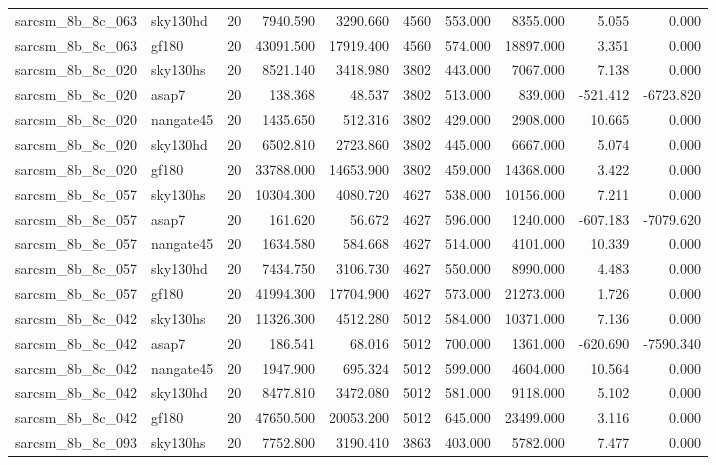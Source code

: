 \documentclass{article}
\begin{document}
\begin{longtable}{llrrrrrrrr}
sarcsm\_8b\_8c\_063 & sky130hd & 20 & 7940.590 & 3290.660 & 4560 & 553.000 & 8355.000 & 5.055 & 0.000 \\
sarcsm\_8b\_8c\_063 & gf180 & 20 & 43091.500 & 17919.400 & 4560 & 574.000 & 18897.000 & 3.351 & 0.000 \\
sarcsm\_8b\_8c\_020 & sky130hs & 20 & 8521.140 & 3418.980 & 3802 & 443.000 & 7067.000 & 7.138 & 0.000 \\
sarcsm\_8b\_8c\_020 & asap7 & 20 & 138.368 & 48.537 & 3802 & 513.000 & 839.000 & -521.412 & -6723.820 \\
sarcsm\_8b\_8c\_020 & nangate45 & 20 & 1435.650 & 512.316 & 3802 & 429.000 & 2908.000 & 10.665 & 0.000 \\
sarcsm\_8b\_8c\_020 & sky130hd & 20 & 6502.810 & 2723.860 & 3802 & 445.000 & 6667.000 & 5.074 & 0.000 \\
sarcsm\_8b\_8c\_020 & gf180 & 20 & 33788.000 & 14653.900 & 3802 & 459.000 & 14368.000 & 3.422 & 0.000 \\
sarcsm\_8b\_8c\_057 & sky130hs & 20 & 10304.300 & 4080.720 & 4627 & 538.000 & 10156.000 & 7.211 & 0.000 \\
sarcsm\_8b\_8c\_057 & asap7 & 20 & 161.620 & 56.672 & 4627 & 596.000 & 1240.000 & -607.183 & -7079.620 \\
sarcsm\_8b\_8c\_057 & nangate45 & 20 & 1634.580 & 584.668 & 4627 & 514.000 & 4101.000 & 10.339 & 0.000 \\
sarcsm\_8b\_8c\_057 & sky130hd & 20 & 7434.750 & 3106.730 & 4627 & 550.000 & 8990.000 & 4.483 & 0.000 \\
sarcsm\_8b\_8c\_057 & gf180 & 20 & 41994.300 & 17704.900 & 4627 & 573.000 & 21273.000 & 1.726 & 0.000 \\
sarcsm\_8b\_8c\_042 & sky130hs & 20 & 11326.300 & 4512.280 & 5012 & 584.000 & 10371.000 & 7.136 & 0.000 \\
sarcsm\_8b\_8c\_042 & asap7 & 20 & 186.541 & 68.016 & 5012 & 700.000 & 1361.000 & -620.690 & -7590.340 \\
sarcsm\_8b\_8c\_042 & nangate45 & 20 & 1947.900 & 695.324 & 5012 & 599.000 & 4604.000 & 10.564 & 0.000 \\
sarcsm\_8b\_8c\_042 & sky130hd & 20 & 8477.810 & 3472.080 & 5012 & 581.000 & 9118.000 & 5.102 & 0.000 \\
sarcsm\_8b\_8c\_042 & gf180 & 20 & 47650.500 & 20053.200 & 5012 & 645.000 & 23499.000 & 3.116 & 0.000 \\
sarcsm\_8b\_8c\_093 & sky130hs & 20 & 7752.800 & 3190.410 & 3863 & 403.000 & 5782.000 & 7.477 & 0.000 \\

\end{longtable}
\end{document}
